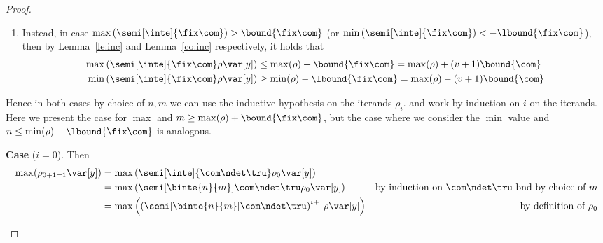 \begin{proof}
\begin{enumerate}[label=(\roman*)]
\begin{enumerate}[label=(\alph*)]
    \item  Instead, in case
      \(\max\left(\semi[\inte]{\fix\com}\right) > \bound{\fix\com}\) (or
      \(\min\left(\semi[\inte]{\fix\com}\right) < -\lbound{\fix\com}\)),
      then by Lemma~\ref{le:inc} and Lemma~\ref{co:inc} respectively, it
      holds that
      \begin{align*}
        \max\left(\semi[\inte]{\fix\com}\rho\var[y]\right) & \leq \max(\rho) + \bound{\fix\com} = \max(\rho) + (v + 1)\bound{\com} \\
        \min\left(\semi[\inte]{\fix\com}\rho\var[y]\right) & \geq \min(\rho) - \lbound{\fix\com} = \max(\rho) - (v + 1)\bound{\com} 
      \end{align*}
    \end{enumerate}
    Hence in both cases by choice of \(n,m\) we can use the inductive
    hypothesis on the iterands \(\rho_i\). %
    and work by induction on \(i\) on the iterands. Here we present
    the case for \(\max\) and
    \(m \geq \max(\rho) + \bound{\fix\com}\), but the case where we
    consider the \(\min\) value and
    \(n \leq \min(\rho) - \lbound{\fix\com}\) is analogous.
    
    \medskip
    
    \noindent
    \textbf{Case} (\(i=0\)).  Then
    \begin{align*}
      \max(\rho_{0+1 = 1}\var[y]) & = \max\left(\semi[\inte]{\com\ndet\tru}\rho_0\var[y]\right) \\
                                  & = \max\left(\semi[\binte{n}{m}]{\com\ndet\tru}\rho_0\var[y]\right) & \text{by induction on } \com\ndet\tru \text{ bnd by choice of } m \\
                                  & = \max\left({\left(\semi[\binte{n}{m}]{\com\ndet\tru}\right)}^{i+1}\rho\var[y]\right) & \text{by definition of } \rho_0
    \end{align*}

    \medskip


\end{enumerate}
\end{proof}

